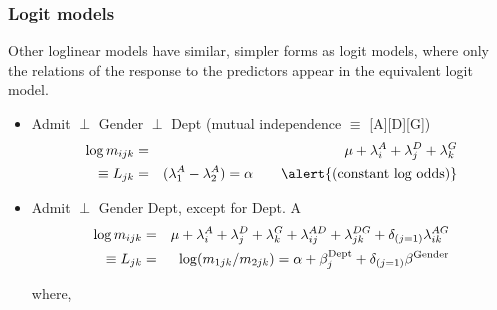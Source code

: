 \begin{frame}
\frametitle{Logit models}
Other loglinear models have similar, simpler forms as logit models, where only the relations of
the response to the predictors appear in the equivalent logit model.
  \begin{itemize}
	\item<1-> Admit $\perp$ Gender $\perp$ Dept (mutual independence $\equiv$ [A][D][G])
	\begin{eqnarray*}
	  \log  m_{ijk}  & = & \mu +  \lambda_i^A +  \lambda_j^D  +  \lambda_k^G \\
	  \equiv L_{jk}  & = & (\lambda_1^A - \lambda_2^A) = \alpha \quad\quad\mbox{\alert{(constant log odds)}}
	\end{eqnarray*}

	\item<2-> Admit $\perp$ Gender \given Dept, except for Dept. A
	\begin{eqnarray*}
	  \log  m_{ijk} & = & \mu +  \lambda_i^A +  \lambda_j^D +  \lambda_k^G
	                    +  \lambda_{ij}^{AD} +  \lambda_{jk}^{DG} +  \delta_{(j=1)} \lambda_{ik}^{AG} \\
	  \equiv L_{jk}  & = &	\log (m_{1jk} / m_{2jk}) = 
	   \alpha   +  \beta _j^{\mbox{\scriptsize Dept}}
	   +  \delta_{(j=1)} \beta^{\mbox{\scriptsize Gender}}			
	\end{eqnarray*}



	   where,
  \end{itemize} 
\end{frame}

